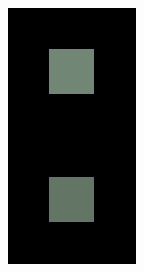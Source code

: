 \documentclass[journal,onecolumn]{IEEEtran}
\begin{document}
\begin{figure}[h] \label{fig:crispening-effect}
    \centering
        \begin{subfigure}[b]{0.2\textwidth}
                \centering
                \includegraphics[width=.85\linewidth, frame]{crisp_1}
                \caption{}
                \label{fig:crispening-effect-a}
        \end{subfigure}%
        \begin{subfigure}[b]{0.2\textwidth}
                \centering

\end{subfigure}
\end{figure}
\end{document}
